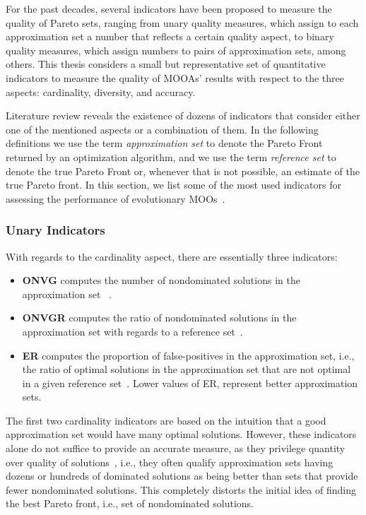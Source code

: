 	For the past decades, several indicators have been proposed to measure the quality of Pareto sets, ranging from unary quality measures, which assign to each approximation set a number that reflects a certain quality aspect, to binary quality measures, which assign numbers to pairs of approximation sets, among others. This thesis considers a small but representative set of quantitative indicators to measure the quality of \acp{MOOA}' results with respect to the three aspects: cardinality, diversity, and accuracy. 
	
	Literature review reveals the existence of dozens of indicators that consider either one of the mentioned aspects or a combination of them. In the following definitions we use the term \textit{approximation set} to denote the Pareto Front returned by an optimization algorithm, and we use the term \textit{reference set} to denote the true Pareto Front or, whenever that is not possible, an estimate of the true Pareto front. 
	In this section, we list some of the most used indicators for assessing the performance of evolutionary \acp{MOO}~\cite{Riquelme2015}. 
	
	
	\subsubsection{Unary Indicators}
	With regards to the cardinality aspect, there are essentially three indicators:
	\begin{itemize}
		\item \textbf{\ac{ONVG}} computes the number of nondominated solutions in the approximation set ~\cite{Veldhuizen1999GD}.
		\item \textbf{\ac{ONVGR}} computes the ratio of nondominated solutions in the approximation set with regards to a reference set~\cite{Veldhuizen1999GD}.
		\item \textbf{\ac{ER}} computes the proportion of false-positives in the approximation set, i.e., the ratio of optimal solutions in the approximation set that are not optimal in a given reference set~\cite{Veldhuizen1999GD}. Lower values of \ac{ER}, represent better approximation sets. 		
	\end{itemize}
	
	The first two cardinality indicators are based on the intuition that a good approximation set would have many optimal solutions. However, these indicators alone do not suffice to provide an accurate measure, as they privilege quantity over quality of solutions~\cite{Veldhuizen1999GD}, i.e., they often qualify approximation sets having dozens or hundreds of dominated solutions as being better than sets that provide fewer nondominated solutions. This completely distorts the initial idea of finding the best Pareto front, i.e., set of nondominated solutions. 
	

